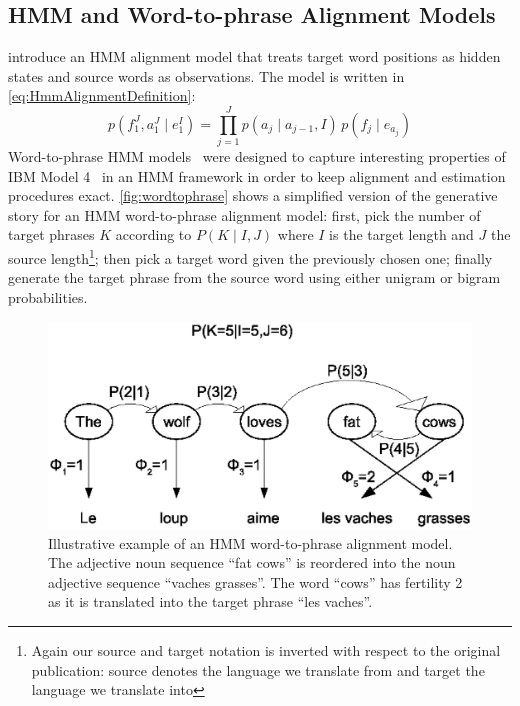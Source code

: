 \subsection{HMM and Word-to-phrase Alignment Models}
\label{sec:statisticalMachineTranslationHmmAlignmentModel}

\citet{vogel-ney-tillmann} introduce an HMM alignment model
that treats target word positions as hidden states and source words as
observations. The model is written in \eqref{eq:HmmAlignmentDefinition}:
%
\begin{equation}
  p(f_1^J, a_1^J \mid e_1^I) = \prod_{j=1}^J p(a_j \mid a_{j-1},I) \, p(f_j \mid e_{a_j})
  \label{eq:HmmAlignmentDefinition}
\end{equation}
%
Word-to-phrase HMM models~\citep{deng-and-byrne:2008:ASLP} were designed to
capture interesting properties of IBM Model
4~\citep{brown-dellapietra-dellapietra-mercer-1993} in an HMM framework in order
to keep alignment and estimation procedures exact. \autoref{fig:wordtophrase}
shows a simplified version of the generative story for an HMM word-to-phrase
alignment model: first, pick the number of target phrases $K$ according to
$P(K \mid I,J)$ where $I$ is the target length and $J$ the source
length\footnote{Again our source and target notation is inverted with respect
to the original publication: source denotes the language we translate from and
target the language we translate into}; then
pick a target word given the previously chosen one; finally generate the target
phrase from the source word using either unigram or bigram probabilities.
%
\begin{figure}
  \begin{center}
    \includegraphics[scale=0.5]{figures/wordtophrase2.eps}
  \end{center}
  \caption{Illustrative example of an HMM word-to-phrase alignment model. The adjective noun sequence ``fat cows'' is
    reordered into the noun adjective sequence ``vaches grasses''. The word ``cows'' has fertility 2 as it is translated
    into the target phrase ``les vaches''.}
  \label{fig:wordtophrase}
\end{figure}
